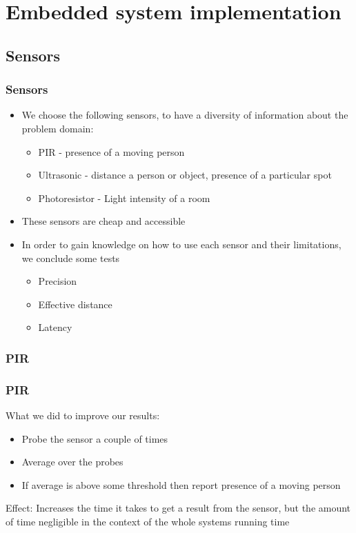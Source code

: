 \section{Embedded system implementation}
\lstset{language=HMMLanguage,numbers=left,breaklines=true,numbersep=0pt}
\subsection{Sensors}
\begin{frame}
	\frametitle{Sensors}
	\begin{itemize}
		\item We choose the following sensors, to have a diversity of information about the problem domain:
		\begin{itemize}
		  \item PIR - presence of a moving person
		  \item Ultrasonic - distance a person or object, presence of a particular spot
		  \item Photoresistor - Light intensity of a room
		\end{itemize}
		\item These sensors are cheap and accessible
		\item In order to gain knowledge on how to use each sensor and their limitations, we conclude some tests
		\begin{itemize}
		  \item Precision
		  \item Effective distance
		  \item Latency
		\end{itemize}
	\end{itemize}
\end{frame}
\subsubsection{PIR}
\begin{frame}
  \frametitle{PIR}
  What we did to improve our results:
	\begin{itemize}
	  \item Probe the sensor a couple of times
	  \item Average over the probes
	  \item If average is above some threshold then report presence of a moving person
	\end{itemize}
Effect: Increases the time it takes to get a result from the sensor, but the amount of time negligible in the context of the whole systems running time
\end{frame}
